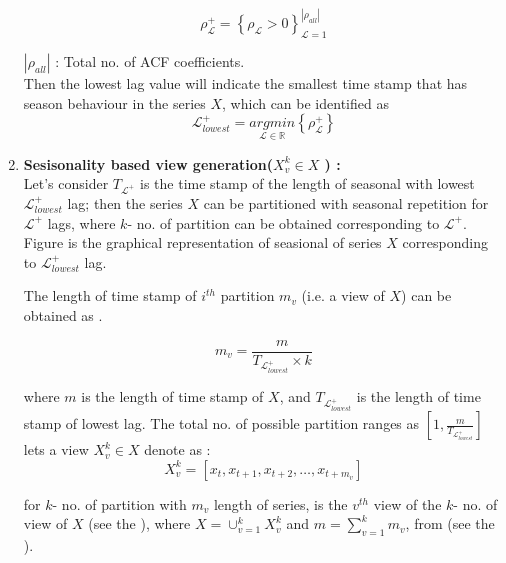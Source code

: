 \begin{enumerate}[label=(\alph*)]
\begin{equation}\label{rhl}
  \rho_\mathscr{L}^+ ={\left\{ \rho_\mathscr{L} > 0 \right\}}_{\mathscr{L}=1}^{\left| \rho_{all}  \right|}
\end{equation} 

$\left|\rho_{all}  \right|$ :  Total no. of ACF coefficients.\\


Then the lowest lag value will indicate the smallest time stamp that has season behaviour in the series $X$, which can be identified as
\begin{equation} \label{lxl}
  \mathscr{L}_{lowest}^+ = \underset{\mathscr{L} \in \mathbb{R}}{arg min} \left\{\rho_{\mathscr{L}}^+  \right\}
\end{equation}



\item \textbf{Sesisonality based view generation($X_v^k \in X$ ) : } \\
Let's consider $T_{\mathscr{L} ^+}$ is the time stamp of the length of seasonal with lowest $\mathscr{L}_{lowest}^+$ lag; then the series $X$ can be partitioned with seasonal repetition for $\mathscr{L}^+$ lags,  where $k$- no. of partition can be obtained corresponding to $\mathscr{L}^+$. Figure  is the graphical representation of seasional of series $X$ corresponding to $\mathscr{L}_{lowest}^+$ lag.

The length of time stamp of $i^{th}$ partition $m_v$ (i.e. a view of $X$) can be obtained as .

\begin{equation} \label{vvtk}
  m_v=\frac{m}{T_{ \mathscr{L}_{lowest}^+ }\times k}
\end{equation}

where $m$ is the length of time stamp of $X$,  and $T_{ \mathscr{L}_{lowest}^+ }$ is the length of time stamp of lowest lag.
The total no. of possible partition ranges as $\left[1,  \frac{m}{T_{\mathscr{L}_{lowest}^+ }} \right]$
lets a view $X_v^k \in X$ denote as : 
\begin{equation} \label{vi g}
  X_v^k = [x_t, x_{t+1}, x_{t+2},  \dots , x_{t+m_v}]
\end{equation}

 for $k$- no. of partition with $m_v$ length of series,  is the $v^{th}$ view of the $k$- no. of view of $X$ (see the  ),  where $X=\cup_{v=1}^k {X_v^k}$ and $m= \sum_{v=1}^{k} m_v$, from  (see the ).


\end{enumerate}
